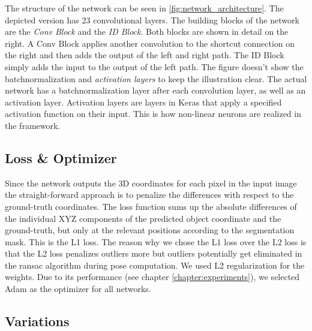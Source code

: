 The structure of the network can be seen in \fig \ref{fig:network_architecture}. The depicted version has 23 convolutional layers. The building blocks of the network are the \textit{Conv Block} and the \textit{ID Block}. Both blocks are shown in detail on the right. A Conv Block applies another convolution to the shortcut connection on the right and then adds the output of the left and right path. The ID Block simply adds the input to the output of the left path. The figure doesn't show the batchnormalization and \textit{activation layers} to keep the illustration clear. The actual network has a batchnormalization layer after each convolution layer, as well as an activation layer. Activation layers are layers in Keras that apply a specified activation function on their input. This is how non-linear neurons are realized in the framework.

\subsection{Loss \& Optimizer}

Since the network outputs the 3D coordinates for each pixel in the input image the straight-forward approach is to penalize the differences with respect to the ground-truth coordinates. The loss function sums up the absolute differences of the individual XYZ components of the predicted object coordinate and the ground-truth, but only at the relevant positions according to the segmentation mask. This is the L1 loss. The reason why we chose the L1 loss over the L2 loss is that the L2 loss penalizes outliers more but outliers potentially get eliminated in the \gls{ransac} algorithm during pose computation. We used L2 regularization for the weights. Due to its performance (see chapter \ref{chapter:experiments}), we selected Adam as the optimizer for all networks.

\subsection{Variations} \label{section:network_variations}


